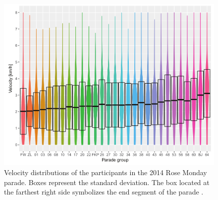 \begin{figure}
	\centering
    \includegraphics[width=0.8\linewidth]{images/polichronidis_velo_distribution.png}
    \caption{Velocity distributions of the participants in the 2014 Rose Monday parade. Boxes represent the standard deviation. The box located at the farthest right side symbolizes the end segment of the parade \cite{Polichronidis_2018}.}
    \label{fig:polichronidis_velo_distribution}
\end{figure}










\nocite{*}